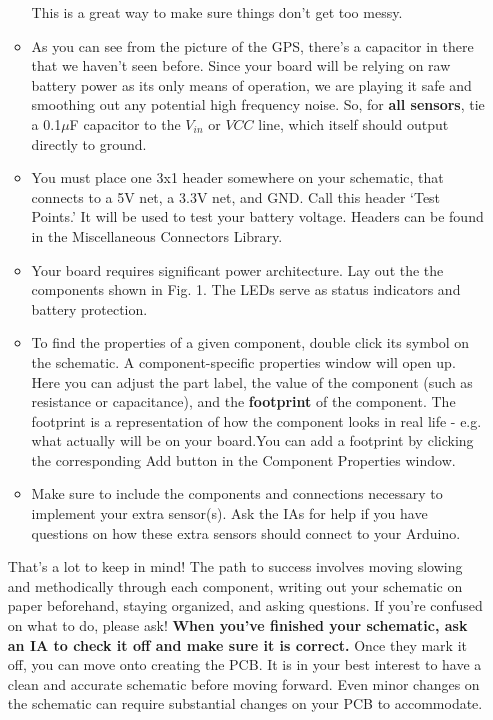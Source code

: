 \documentclass[12pt]{article}
\begin{document}
\begin{enumerate}
\begin{itemize}
    This is a great way to make sure things don't get too messy.
    
    \item As you can see from the picture of the GPS, there's a capacitor in there that we haven't seen before. Since your board will be relying on raw battery power as its only means of operation, we are playing it safe and smoothing out any potential high frequency noise. So, for \textbf{all sensors}, tie a 0.1$\mu$F capacitor to the $V_{in}$ or $VCC$ line, which itself should output directly to ground.
    
    \item You must place one 3x1 header somewhere on your schematic, that connects to a 5V net, a 3.3V net, and GND. Call this header `Test Points.' It will be used to test your battery voltage.
    Headers can be found in the Miscellaneous Connectors Library.
    
    \item Your board requires significant power architecture. Lay out the the components shown in Fig. 1. The LEDs serve as status indicators and battery protection.

    \item To find the properties of a given component, double click its symbol on the schematic. A component-specific properties window will open up. Here you can adjust the part label, the value of the component (such as resistance or capacitance), and the \textbf{footprint} of the component. The footprint is a representation of how the component looks in real life - e.g. what actually will be on your board.You can add a footprint by clicking the corresponding Add button in the Component Properties window.
    
    \item Make sure to include the components and connections necessary to implement your extra sensor(s). Ask the IAs for help if you have questions on how these extra sensors should connect to your Arduino.
    \end{itemize}
    
    That's a lot to keep in mind! The path to success involves moving slowing and methodically through each component, writing out your schematic on paper beforehand, staying organized, and asking questions. If you're confused on what to do, please ask! \textbf{When you've finished your schematic, ask an IA to check it off and make sure it is correct.} Once they mark it off, you can move onto creating the PCB. It is in your best interest to have a clean and accurate schematic before moving forward. Even minor changes on the schematic can require substantial changes on your PCB to accommodate.
    \end{enumerate}
    
\end{document}
